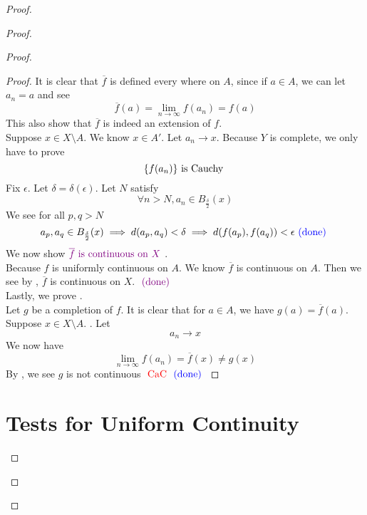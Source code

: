 \documentclass{report}
\begin{document}
\begin{proof}
\begin{proof}
\begin{proof}
\begin{proof}
It is clear that $\overline{f}$ is defined every where on  $A$, since if  $a\in A$, we can let $a_n=a$ and see 
\begin{equation*}
\overline{f}(a)=\lim_{n\to\infty}f(a_n)=f(a)
\end{equation*}
This also show that $\overline{f}$ is indeed an extension of $f$.\\

Suppose $x\in X\setminus A$. We know $x\in A'$. Let $a_n\to x$. Because $Y$ is complete, we only have to prove 
\begin{equation*}
\{ f(a_n) \}\text{ is Cauchy }
\end{equation*}
Fix $\epsilon $. Let $\delta=\delta(\epsilon )$. Let $N$ satisfy 
 \begin{equation*}
\forall n>N, a_n\in B_{\frac{\delta}{2}}(x)
\end{equation*}
We see for all $p,q>N$
 \begin{equation*}
a_p,a_q\in B_{\frac{\delta}{2}}(x)\implies d(a_p,a_q)<\delta \implies d(f(a_p),f(a_q))<\epsilon \textcolor{blue}{\text{ (done) }}
\end{equation*}
We now show $\textcolor{violet}{\overline{f}\text{ is continuous on $X$ }}$.\\

Because $f$ is uniformly continuous on $A$. We know  $\overline{f}$ is continuous on $A$. Then we see by  , $\overline{f}$ is continuous on $X$. $\textcolor{violet}{\text{ (done) }}$\\

Lastly, we prove  .\\

Let $g$ be a completion of  $f$.  It is clear that for $a\in A$, we have $g(a)=\overline{f}(a)$. Suppose $x\in X\setminus A$. . Let 
\begin{equation*}
a_n \to x
\end{equation*}
We now have 
\begin{equation*}
\lim_{n\to \infty}f(a_n)=\overline{f}(x)\neq g(x)
\end{equation*}
By , we see $g$ is not continuous  $\text{ \textcolor{red}{CaC} }\textcolor{blue}{\text{ (done) }}$ 
\end{proof}
\section{Tests for Uniform Continuity}


\end{proof}
\end{proof}
\end{proof}
\end{document}
